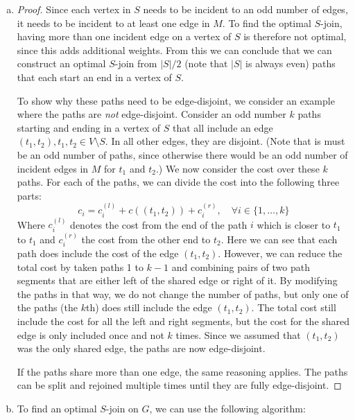 \documentclass[a4paper,12pt,headsepline]{scrartcl}
\begin{document}
\begin{enumerate}[a)]
  \item 
    \begin{proof}
      Since each vertex in $S$ needs to be incident to an odd number of edges, it needs to be incident to at least one edge in $M$.
      To find the optimal $S$-join, having more than one incident edge on a vertex of $S$ is therefore not optimal, since this adds additional weights.
      From this we can conclude that we can construct an optimal $S$-join from $|S|/2$ (note that $|S|$ is always even) paths that each start an end in a vertex of $S$.

      To show why these paths need to be edge-disjoint, we consider an example where the paths are \emph{not} edge-disjoint.
      Consider an odd number $k$ paths starting and ending in a vertex of $S$ that all include an edge $(t_1,t_2), t_1,t_2\in V\setminus S$.
      In all other edges, they are disjoint.
      (Note that is must be an odd number of paths, since otherwise there would be an odd number of incident edges in $M$ for $t_1$ and $t_2$.)
      We now consider the cost over these $k$ paths.
      For each of the paths, we can divide the cost into the following three parts:
      \[ c_i = c^{(l)}_i + c((t_1,t_2)) + c^{(r)}_i,\quad\forall i\in\{1,\dots,k\} \]
      Where $c^{(l)}_i$ denotes the cost from the end of the path $i$ which is closer to $t_1$ to $t_1$ and $c^{(r)}_i$ the cost from the other end to $t_2$.
      Here we can see that each path does include the cost of the edge $(t_1,t_2)$.
      However, we can reduce the total cost by taken paths 1 to $k-1$ and combining pairs of two path segments that are either left of the shared edge or right of it.
      By modifying the paths in that way, we do not change the number of paths, but only one of the paths (the $k$th) does still include the edge $(t_1,t_2)$.
      The total cost still include the cost for all the left and right segments, but the cost for the shared edge is only included once and not $k$ times.
      Since we assumed that $(t_1,t_2)$ was the only shared edge, the paths are now edge-disjoint.

      If the paths share more than one edge, the same reasoning applies.
      The paths can be split and rejoined multiple times until they are fully edge-disjoint.
    \end{proof}

  \item To find an optimal $S$-join on $G$, we can use the following algorithm:


\end{enumerate}
\end{document}

